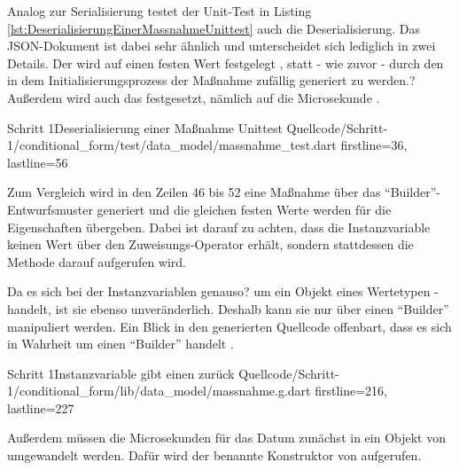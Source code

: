 Analog zur Serialisierung testet der Unit-Test in Listing \ref{lst:DeserialisierungEinerMassnahmeUnittest} auch die Deserialisierung.
Das JSON-Dokument ist dabei sehr ähnlich und unterscheidet sich lediglich in zwei Details.
Der  wird auf einen festen Wert festgelegt , statt - wie zuvor - durch den in dem Initialisierungsprozess der Maßnahme zufällig generiert zu werden.?
Außerdem wird auch das  festgesetzt, nämlich auf die Microsekunde  .

\begin{alexlisting}{Schritt 1}{Deserialisierung einer Maßnahme Unittest}
  {Quellcode/Schritt-1/conditional_form/test/data_model/massnahme_test.dart}
  {firstline=36, lastline=56}
  \label{lst:DeserialisierungEinerMassnahmeUnittest}
\end{alexlisting}


Zum Vergleich wird in den Zeilen 46 bis 52 eine Maßnahme über das \enquote{Builder}-Entwurfsmuster generiert und die gleichen festen Werte werden für die Eigenschaften übergeben.
Dabei ist darauf zu achten, dass die Instanzvariable  keinen Wert über den Zuweisungs-Operator \IC{=} erhält, sondern stattdessen die Methode  darauf aufgerufen wird.

Da es sich bei der Instanzvariablen  genauso? um ein Objekt eines Wertetypen - handelt, ist sie ebenso unveränderlich.
Deshalb kann sie nur über einen \enquote{Builder} manipuliert werden.
Ein Blick in den generierten Quellcode offenbart, dass es sich in Wahrheit um einen \enquote{Builder} handelt .

\begin{alexlisting}{Schritt 1}{Instanzvariable  gibt einen  zurück}
  {Quellcode/Schritt-1/conditional_form/lib/data_model/massnahme.g.dart}
  {firstline=216, lastline=227}
  \label{lst:Schritt1InstanzvariableLetzteBearbeitungGibtEinenLetzteBearbeitungBuilderZurueck}
\end{alexlisting}

Außerdem müssen die Microsekunden für das Datum zunächst in ein Objekt von  umgewandelt werden.
Dafür wird der benannte Konstruktor  von   aufgerufen.

